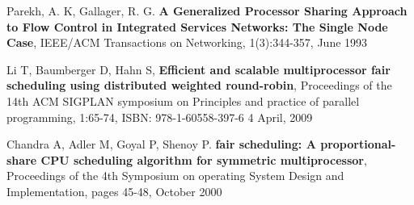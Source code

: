 \documentclass[11pt]{article}
\begin{document}
\begin{thebibliography}{9}
	Parekh, A. K, Gallager, R. G.
	\textbf{A Generalized Processor Sharing Approach to Flow Control in Integrated Services Networks: The Single Node Case},
	IEEE/ACM Transactions on Networking,	
	1(3):344-357,
	June 1993
	
	Li T, Baumberger D, Hahn S,
	\textbf{Efficient and scalable multiprocessor fair scheduling using distributed weighted round-robin},
	Proceedings of the 14th ACM SIGPLAN symposium on Principles and practice of parallel programming,
	1:65-74, ISBN: 978-1-60558-397-6
	4 April, 2009

 	Chandra A, Adler M, Goyal P, Shenoy P.
 	\textbf{fair scheduling: A proportional-share CPU scheduling algorithm for symmetric multiprocessor},
 	Proceedings of the 4th Symposium on operating System Design and Implementation,
 	pages 45-48,
 	October 2000
	
\end{thebibliography}
\end{document}
